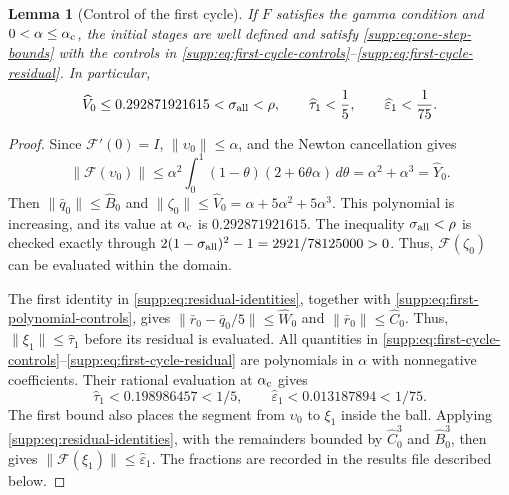 \documentclass[11pt,a4paper]{article}
\numberwithin{equation}{section}
\numberwithin{table}{section}
\theoremstyle{plain}
\newtheorem{lemma}[theorem]{Lemma}
\theoremstyle{definition}\newtheorem{definition}[theorem]{Definition}
\theoremstyle{remark}\newtheorem{remark}[theorem]{Remark}
\begin{document}
\begin{lemma}[Control of the first cycle]\label{supp:lem:first-cycle-controls}
If $F$ satisfies the gamma condition and $0<\alpha\leq\alpha_{\rm c}$,
the initial stages are well defined and satisfy
\eqref{supp:eq:one-step-bounds} with the controls in
\eqref{supp:eq:first-cycle-controls}--\eqref{supp:eq:first-cycle-residual}.
In particular,
\begin{equation}
 \widehat V_0\leq0.292871921615<\sigma_{\rm all}<\rho,\qquad
 \widehat\tau_1<\frac15,\qquad
 \widehat\varepsilon_1<\frac1{75}.
\label{supp:eq:first-cycle-upper-bounds}
\end{equation}
\end{lemma}
\begin{proof}
Since $\mathcal F'(0)=I$, $\|\upsilon_0\|\leq\alpha$, and the
Newton cancellation gives
\[
 \|\mathcal F(\upsilon_0)\|
 \leq\alpha^2\int_0^1(1-\theta)(2+6\theta\alpha)\,d\theta
 =\alpha^2+\alpha^3=\widehat Y_0.
\]
Then $\|\bar q_0\|\leq\widehat B_0$ and
$\|\zeta_0\|\leq\widehat V_0=\alpha+5\alpha^2+5\alpha^3$.
This polynomial is increasing, and its value at $\alpha_{\rm c}$ is
$0.292871921615$. The inequality $\sigma_{\rm all}<\rho$ is checked
exactly through $2(1-\sigma_{\rm all})^2-1=2921/78125000>0$.
Thus, $\mathcal F(\zeta_0)$ can be evaluated within the domain.

The first identity in \eqref{supp:eq:residual-identities}, together
with \eqref{supp:eq:first-polynomial-controls}, gives
$\|\bar r_0-\bar q_0/5\|\leq\widehat W_0$ and
$\|\bar r_0\|\leq\widehat C_0$. Thus,
$\|\xi_1\|\leq\widehat\tau_1$ before its residual is evaluated.
All quantities in
\eqref{supp:eq:first-cycle-controls}--\eqref{supp:eq:first-cycle-residual}
are polynomials in $\alpha$ with nonnegative coefficients. Their
rational evaluation at $\alpha_{\rm c}$ gives
\[
 \widehat\tau_1<0.198986457<1/5,\qquad
 \widehat\varepsilon_1<0.013187894<1/75.
\]
The first bound also places the segment from $\upsilon_0$ to $\xi_1$
inside the ball. Applying \eqref{supp:eq:residual-identities}, with
the remainders bounded by $\widehat C_0^3$ and $\widehat B_0^3$,
then gives $\|\mathcal F(\xi_1)\|\leq\widehat\varepsilon_1$.
The fractions are recorded in the results file described below.
\end{proof}
\end{document}
